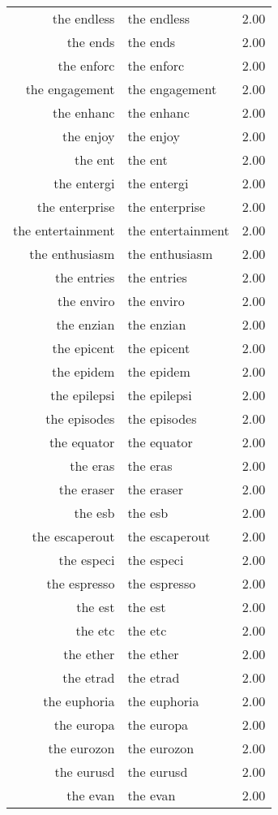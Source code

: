 \begin{table}[ht]
\begin{tabular}{rlr}
  the endless & the endless & 2.00 \\ 
  the ends & the ends & 2.00 \\ 
  the enforc & the enforc & 2.00 \\ 
  the engagement & the engagement & 2.00 \\ 
  the enhanc & the enhanc & 2.00 \\ 
  the enjoy & the enjoy & 2.00 \\ 
  the ent & the ent & 2.00 \\ 
  the entergi & the entergi & 2.00 \\ 
  the enterprise & the enterprise & 2.00 \\ 
  the entertainment & the entertainment & 2.00 \\ 
  the enthusiasm & the enthusiasm & 2.00 \\ 
  the entries & the entries & 2.00 \\ 
  the enviro & the enviro & 2.00 \\ 
  the enzian & the enzian & 2.00 \\ 
  the epicent & the epicent & 2.00 \\ 
  the epidem & the epidem & 2.00 \\ 
  the epilepsi & the epilepsi & 2.00 \\ 
  the episodes & the episodes & 2.00 \\ 
  the equator & the equator & 2.00 \\ 
  the eras & the eras & 2.00 \\ 
  the eraser & the eraser & 2.00 \\ 
  the esb & the esb & 2.00 \\ 
  the escaperout & the escaperout & 2.00 \\ 
  the especi & the especi & 2.00 \\ 
  the espresso & the espresso & 2.00 \\ 
  the est & the est & 2.00 \\ 
  the etc & the etc & 2.00 \\ 
  the ether & the ether & 2.00 \\ 
  the etrad & the etrad & 2.00 \\ 
  the euphoria & the euphoria & 2.00 \\ 
  the europa & the europa & 2.00 \\ 
  the eurozon & the eurozon & 2.00 \\ 
  the eurusd & the eurusd & 2.00 \\ 
  the evan & the evan & 2.00 \\ 

\end{tabular}
\end{table}
